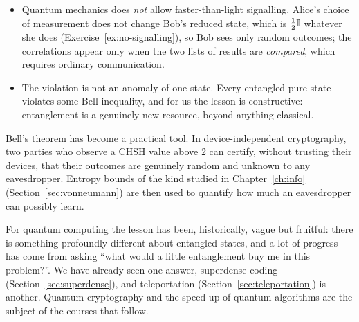 \begin{itemize}
  \item Quantum mechanics does \emph{not} allow faster-than-light signalling. Alice's choice of measurement does not change Bob's reduced state, which is $\tfrac12\mathbb{I}$ whatever she does (Exercise~\ref{ex:no-signalling}), so Bob sees only random outcomes; the correlations appear only when the two lists of results are \emph{compared}, which requires ordinary communication.
  \item The violation is not an anomaly of one state. Every entangled pure state violates some Bell inequality, and for us the lesson is constructive: entanglement is a genuinely new resource, beyond anything classical.
\end{itemize}

\begin{lookahead}
  Bell's theorem has become a practical tool. In device-independent cryptography, two parties who observe a CHSH value above $2$ can certify, without trusting their devices, that their outcomes are genuinely random and unknown to any eavesdropper. Entropy bounds of the kind studied in Chapter~\ref{ch:info} (Section~\ref{sec:vonneumann}) are then used to quantify how much an eavesdropper can possibly learn.
\end{lookahead}

For quantum computing the lesson has been, historically, vague but fruitful: there is something profoundly different about entangled states, and a lot of progress has come from asking ``what would a little entanglement buy me in this problem?''. We have already seen one answer, superdense coding (Section~\ref{sec:superdense}), and teleportation (Section~\ref{sec:teleportation}) is another. Quantum cryptography and the speed-up of quantum algorithms are the subject of the courses that follow.

